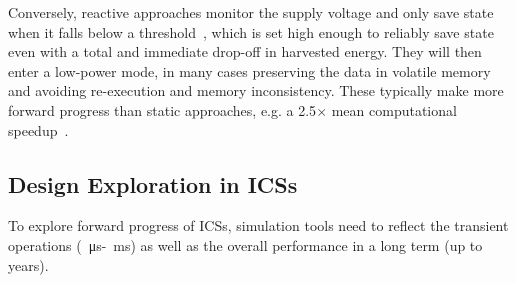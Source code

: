 Conversely, reactive approaches monitor the supply voltage and only save state when it falls below a threshold~\cite{7442814, 7849206, 7807254}, which is set high enough to reliably save state even with a total and immediate drop-off in harvested energy. They will then enter a low-power mode, in many cases preserving the data in volatile memory and avoiding re-execution and memory inconsistency. These typically make more forward progress than static approaches, e.g. a 2.5$\times$ mean computational speedup~\cite{Maeng:2019:SPI:3314221.3314613}. 

\color{blue}
\subsection{Design Exploration in ICSs}

To explore forward progress of ICSs, simulation tools need to reflect the transient operations  (\SI{}{\micro\second}-\SI{}{\milli\second}) as well as the overall performance in a long term (up to years). 

